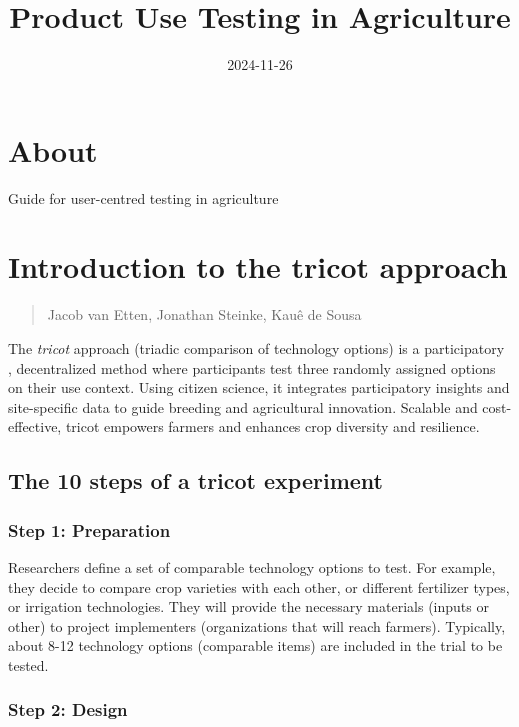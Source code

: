 \documentclass[
]{book}
\title{Product Use Testing in Agriculture}
\author{}
\date{\vspace{-2.5em}2024-11-26}
\begin{document}
\maketitle

{
\setcounter{tocdepth}{1}
\tableofcontents
}
\chapter{About}\label{about}

Guide for user-centred testing in agriculture

\chapter{Introduction to the tricot approach}\label{introduction-to-the-tricot-approach}

\begin{quote}
Jacob van Etten, Jonathan Steinke, Kauê de Sousa
\end{quote}

The \emph{tricot} approach (triadic comparison of technology options) is a participatory \citep{vanetten_tricot}, decentralized method where participants test three randomly assigned options on their use context. Using citizen science, it integrates participatory insights and site-specific data to guide breeding and agricultural innovation. Scalable and cost-effective, tricot empowers farmers and enhances crop diversity and resilience.

\section{The 10 steps of a tricot experiment}\label{the-10-steps-of-a-tricot-experiment}

\subsection{Step 1: Preparation}\label{step-1-preparation}

Researchers define a set of comparable technology options to test. For example, they decide to compare crop varieties with each other, or different fertilizer types, or irrigation technologies. They will provide the necessary materials (inputs or other) to project implementers (organizations that will reach farmers). Typically, about 8-12 technology options (comparable items) are included in the trial to be tested.

\subsection{Step 2: Design}\label{step-2-design}
\end{document}
